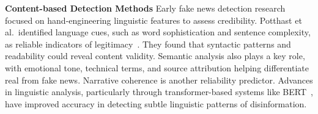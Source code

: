 \documentclass[runningheads]{llncs}
\begin{document}
\vspace{0.25\baselineskip}
\noindent \textbf{Content-based Detection Methods}
Early fake news detection research focused on hand-engineering linguistic features to assess credibility. Potthast et al.~identified language cues, such as word sophistication and sentence complexity, as reliable indicators of legitimacy~\cite{potthast2018hyperpartisan}. They found that syntactic patterns and readability could reveal content validity.
Semantic analysis also plays a key role, with emotional tone, technical terms, and source attribution helping differentiate real from fake news. Narrative coherence is another reliability predictor. Advances in linguistic analysis, particularly through transformer-based systems like BERT~\cite{devlin2019bert}, have improved accuracy in detecting subtle linguistic patterns of disinformation.
\end{document}
